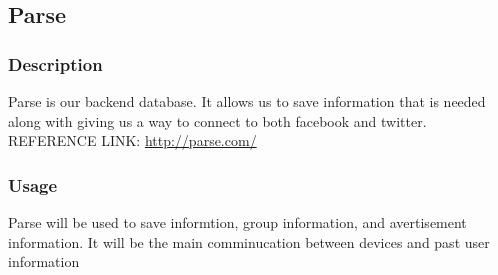\subsection{Parse}
	\subsubsection{Description}
	Parse is our backend database. It allows us to save information that is needed along with giving us a way to connect to both facebook and twitter.
\newline
REFERENCE LINK: \url{http://parse.com/}
	\subsubsection{Usage}
	Parse will be used to save informtion, group information, and avertisement information. It will be the main comminucation between devices and past user information



